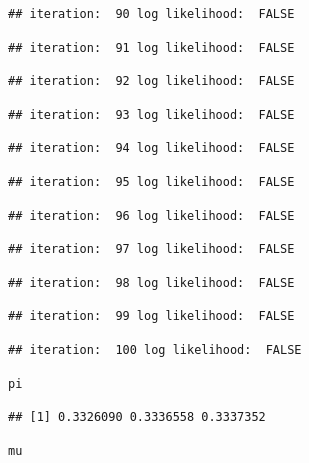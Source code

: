 \documentclass[
]{article}
\begin{document}
\begin{lstlisting}
## iteration:  90 log likelihood:  FALSE
\end{lstlisting}

\begin{lstlisting}
## iteration:  91 log likelihood:  FALSE
\end{lstlisting}

\begin{lstlisting}
## iteration:  92 log likelihood:  FALSE
\end{lstlisting}

\begin{lstlisting}
## iteration:  93 log likelihood:  FALSE
\end{lstlisting}

\begin{lstlisting}
## iteration:  94 log likelihood:  FALSE
\end{lstlisting}

\begin{lstlisting}
## iteration:  95 log likelihood:  FALSE
\end{lstlisting}

\begin{lstlisting}
## iteration:  96 log likelihood:  FALSE
\end{lstlisting}

\begin{lstlisting}
## iteration:  97 log likelihood:  FALSE
\end{lstlisting}

\begin{lstlisting}
## iteration:  98 log likelihood:  FALSE
\end{lstlisting}

\begin{lstlisting}
## iteration:  99 log likelihood:  FALSE
\end{lstlisting}

\begin{lstlisting}
## iteration:  100 log likelihood:  FALSE
\end{lstlisting}

\begin{lstlisting}[language=R]
pi
\end{lstlisting}

\begin{lstlisting}
## [1] 0.3326090 0.3336558 0.3337352
\end{lstlisting}

\begin{lstlisting}[language=R]
mu
\end{lstlisting}
\end{document}
